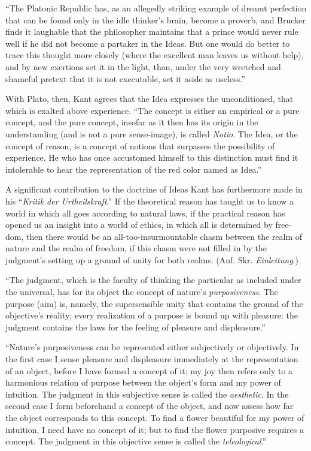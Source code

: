 \documentclass[12pt]{book}
\begin{document}
``The Platonic Republic has, as an allegedly striking example of dreamt perfection that can be found
only in the idle thinker's brain, become a proverb, and Brucker finds it laughable that the
philosopher maintains that a prince would never rule well if he did not become a partaker in the
Ideas. But one would do better to trace this thought more closely (where the excellent man leaves us
without help), and by new exertions set it in the light, than, under the very wretched and shameful
pretext that it is not executable, set it aside as useless.''

With Plato, then, Kant agrees that the Idea expresses the unconditioned, that which is exalted above
experience. ``The concept is either an empirical or a pure concept, and the pure concept, insofar
as it then has its origin in the understanding (and is not a pure sense-image), is called
\textit{Notio}. The Idea, or the concept of reason, is a concept of notions that surpasses the
possibility of experience. He who has once accustomed himself to this distinction must find it
intolerable to hear the representation of the red color named as Idea.''

A significant contribution to the doctrine of Ideas Kant has furthermore made in his ``\textit{Kritik
der Urtheilskraft}.'' If the theoretical reason has taught us to know a world in which all goes
according to natural laws, if the practical reason has opened us an insight into a world of ethics,
in which all is determined by free-
dom, then there would be an all-too-insurmountable chasm between the realm of nature and the realm
of freedom, if this chasm were not filled in by the judgment's setting up a ground of unity for both
realms. (Anf. Skr. \textit{Einleitung}.)

``The judgment, which is the faculty of thinking the particular as included under the universal, has
for its object the concept of nature's \emph{purposiveness}. The purpose (aim) is, namely, the
supersensible unity that contains the ground of the objective's reality; every realization of a
purpose is bound up with pleasure: the judgment contains the laws for the feeling of pleasure and
displeasure.''

``Nature's purposiveness can be represented either subjectively or objectively. In the first case I
sense pleasure and displeasure immediately at the representation of an object, before I have formed a
concept of it; my joy then refers only to a harmonious relation of purpose between the object's form
and my power of intuition. The judgment in this subjective sense is called the \emph{aesthetic}. In
the second case I form beforehand a concept of the object, and now assess how far the object
corresponds to this concept. To find a flower beautiful for my power of intuition, I need have no
concept of it; but to find the flower purposive requires a concept. The judgment in this objective
sense is called the \emph{teleological}.''
\end{document}
